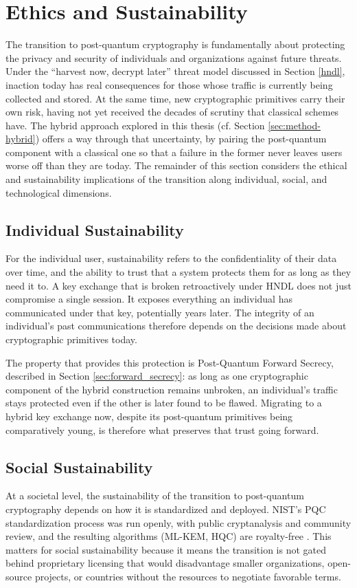 \section{Ethics and Sustainability} 
The transition to post-quantum cryptography is fundamentally about protecting the privacy and security of individuals and organizations against future threats. Under the ``harvest now, decrypt later'' threat model discussed in Section \ref{hndl}, inaction today has real consequences for those whose traffic is currently being collected and stored. At the same time, new cryptographic primitives carry their own risk, having not yet received the decades of scrutiny that classical schemes have. The hybrid approach explored in this thesis (cf. Section \ref{sec:method-hybrid}) offers a way through that uncertainty, by pairing the post-quantum component with a classical one so that a failure in the former never leaves users worse off than they are today. The remainder of this section considers the ethical and sustainability implications of the transition along individual, social, and technological dimensions.

\subsection{Individual Sustainability}
For the individual user, sustainability refers to the confidentiality of their data over time, and the ability to trust that a system protects them for as long as they need it to. A key exchange that is broken retroactively under HNDL does not just compromise a single session. It exposes everything an individual has communicated under that key, potentially years later. The integrity of an individual's past communications therefore depends on the decisions made about cryptographic primitives today.

The property that provides this protection is Post-Quantum Forward Secrecy, described in Section \ref{sec:forward_secrecy}: as long as one cryptographic component of the hybrid construction remains unbroken, an individual's traffic stays protected even if the other is later found to be flawed. Migrating to a hybrid key exchange now, despite its post-quantum primitives being comparatively young, is therefore what preserves that trust going forward.

\subsection{Social Sustainability}
At a societal level, the sustainability of the transition to post-quantum cryptography depends on how it is standardized and deployed. NIST's PQC standardization process was run openly, with public cryptanalysis and community review, and the resulting algorithms (ML-KEM, HQC) are royalty-free \cite{nistpqc}. This matters for social sustainability because it means the transition is not gated behind proprietary licensing that would disadvantage smaller organizations, open-source projects, or countries without the resources to negotiate favorable terms.


